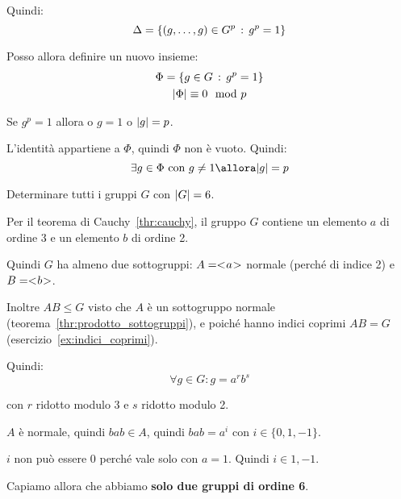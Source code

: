 \begin{dimostrazione}
    Quindi:
    \begin{equation*}
        \Delta = \{(g, \dots, g) \in G^p \,:\, g^p = 1\}
    \end{equation*}

    Posso allora definire un nuovo insieme:
    \begin{gather*}
        \Phi = \{g \in G \,:\, g^p = 1\} \\
        \lvert \Phi \rvert \equiv 0 \mod p
    \end{gather*}

    Se $g^p = 1$ allora o $g = 1$ o $\lvert g \rvert = p$.

    L'identità appartiene a $\Phi$, quindi $\Phi$ non è vuoto.
    Quindi:
    \begin{equation*}
        \exists g \in \Phi \text{ con } g \ne 1 \allora \ordine{g} = p
    \end{equation*}

\end{dimostrazione}

\begin{esercizio}
    Determinare tutti i gruppi $G$ con $\lvert G \rvert = 6$.
\end{esercizio}

\begin{soluzione}
    Per il teorema di Cauchy~\ref{thr:cauchy}, il gruppo $G$ contiene un elemento $a$ di ordine 3 e un elemento $b$ di
    ordine 2.

    Quindi $G$ ha almeno due sottogruppi: $A = < \negmedspace a \negmedspace >$ normale (perché di indice 2) e $B = < \negmedspace b \negmedspace >$.

    Inoltre $AB \le G$ visto che $A$ è un sottogruppo normale (teorema~\ref{thr:prodotto_sottogruppi}), e poiché
    hanno indici coprimi $AB = G$ (esercizio~\ref{ex:indici_coprimi}).

    Quindi:
    \begin{equation*}
        \forall g \in G : g = a^r b^s
    \end{equation*}

    con $r$ ridotto modulo 3 e $s$ ridotto modulo 2.

    $A$ è normale, quindi $b a b \in A$, quindi $b a b = a^i$ con $i \in \{0,1,-1\}$.

    $i$ non può essere 0 perché vale solo con $a = 1$.
    Quindi $i \in {1, -1}$.

    Capiamo allora che abbiamo \textbf{solo due gruppi di ordine 6}.


\end{soluzione}